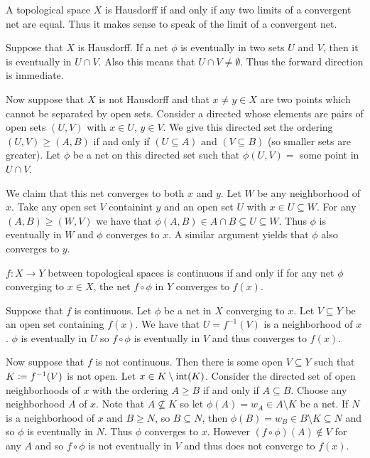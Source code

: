 \documentclass[letterpaper, 11pt]{article}
\begin{document}
\begin{prop}
  A topological space $X$ is Hausdorff if and only if any two limits of a convergent net are equal.
  Thus it makes sense to speak of the limit of a convergent net.
\end{prop}
\begin{pf}
  Suppose that $X$ is Hausdorff.
  If a net $\phi$ is eventually in two sets $U$ and $V$, then it is eventually in $U \cap V$.
  Also this means that $U \cap V \neq \emptyset$.
  Thus the forward direction is immediate.

  Now suppose that $X$ is not Hausdorff and that $x \neq y \in X$ are two points which cannot be separated by open sets.
  Consider a directed whose elements are pairs of open sets $(U, V)$ with $x \in U$, $y \in V$.
  We give this directed set the ordering $(U, V) \geq (A, B)$ if and only if $(U \subseteq A) \text{ and } (V \subseteq B)$ (so smaller sets are greater).
  Let $\phi$ be a net on this directed set such that $\phi(U, V) = $ some point in $U \cap V$.

  We claim that this net converges to both $x$ and $y$.
  Let $W$ be any neighborhood of $x$.
  Take any open set $V$ containint $y$ and an open set $U$ with $x \in U \subseteq W$.
  For any $(A, B) \geq (W, V)$ we have that $\phi(A, B) \in A \cap B \subseteq U \subseteq W$.
  Thus $\phi$ is eventually in $W$ and $\phi$ converges to $x$.
  A similar argument yields that $\phi$ also converges to $y$.
\end{pf}

\clearpage

\begin{prop}\label{prop: continuous_iff_net_converges}
  $f\colon X \to Y$ between topological spaces is continuous if and only if for any net $\phi$ converging to $x \in X$, the net $f \circ \phi$ in $Y$ converges to $f(x)$.
\end{prop}
\begin{pf}
  Suppose that $f$ is continuous.
  Let $\phi$ be a net in $X$ converging to $x$.
  Let $V \subseteq Y$ be an open set containing $f(x)$.
  We have that $U = f^{-1}(V)$ is a neighborhood of $x$.
  $\phi$ is eventually in $U$ so $f \circ \phi$ is eventually in $V$ and thus converges to $f(x)$.

  Now suppose that $f$ is not continuous.
  Then there is some open $V \subseteq Y$ such that $K \coloneqq f^{-1}(V)$ is not open.
  Let $x \in K \setminus \operatorname{int}(K)$.
  Consider the directed set of open neighborhoods of $x$ with the ordering $A \geq B$ if and only if $A \subseteq B$.
  Choose any neighborhood $A$ of $x$.
  Note that $A \not\subseteq K$ so let $\phi(A) = w_{A} \in A \setminus K$ be a net.
  If $N$ is a neighborhood of $x$ and $B \geq N$, so $B \subseteq N$, then $\phi(B) = w_{B} \in B \setminus K \subseteq N$ and so $\phi$ is eventually in $N$.
  Thus $\phi$ converges to $x$.
  However $(f \circ \phi)(A) \notin V$ for any $A$ and so $f \circ \phi$ is not eventually in $V$ and thus does not converge to $f(x)$.
\end{pf}
\end{document}
